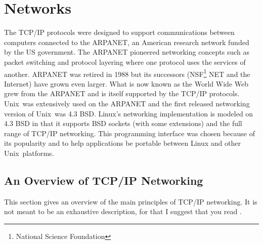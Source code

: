 \chapter{Networks}
\label{networks-chapter}
\label{network-chapter}

The TCP/IP protocols were designed to support communications between computers connected to the
ARPANET, an American research network funded by the US government.
The ARPANET pioneered networking concepts such as packet switching and protocol layering
where one protocol uses the services of another.
ARPANET was retired in 1988 but its successors (NSF\footnote{National Science Foundation} NET and
the Internet) have grown even larger.
What is now known as the World Wide Web grew from the ARPANET and is itself supported by the
TCP/IP protocols.
Unix\tm\ was extensively used on the ARPANET and the first released networking version of 
Unix\tm\ was 4.3 BSD.
Linux's networking implementation is modeled on 4.3 BSD in that it supports BSD sockets (with
some extensions) and the full range of TCP/IP networking.
This programming interface was chosen because of its popularity and to help applications
be portable between Linux and other Unix\tm\ platforms.

\section{An Overview of TCP/IP Networking}
This section gives an overview of the main principles of TCP/IP networking.
It is not meant to be an exhaustive description, for that I suggest that you read
\cite[Comer]{bib-comer}.
 
